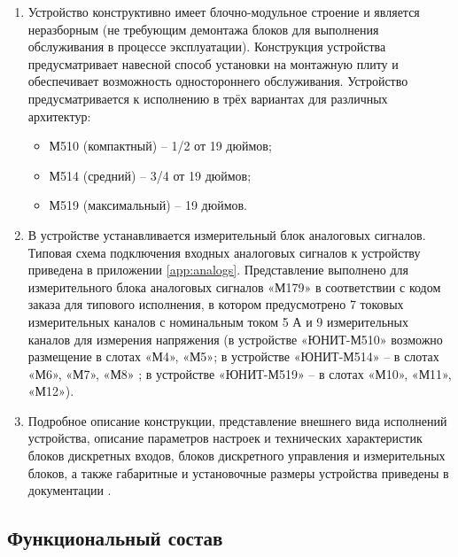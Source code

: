 \begin{enumerate}
\item Устройство конструктивно имеет блочно-модульное строение и является неразборным (не требующим демонтажа блоков для выполнения обслуживания в процессе эксплуатации).
Конструкция устройства предусматривает навесной способ установки на монтажную плиту и обеспечивает возможность одностороннего обслуживания.
Устройство предусматривается к исполнению в трёх вариантах для различных архитектур:
\begin{itemize}
\item М510 (компактный) – 1/2 от 19 дюймов;
\item М514 (средний) – 3/4 от 19 дюймов;
\item М519 (максимальный) – 19 дюймов.
\end{itemize}
\item В устройстве устанавливается измерительный блок аналоговых сигналов. Типовая схема подключения входных аналоговых сигналов к устройству приведена в приложении \ref{app:analogs}. Представление выполнено для измерительного блока аналоговых сигналов «М179» в соответствии с кодом заказа для типового исполнения, в котором предусмотрено 7 токовых измерительных каналов с номинальным током 5 А и 9 измерительных каналов для измерения напряжения (в устройстве «ЮНИТ-М510» возможно размещение в слотах «М4», «М5»; в устройстве «ЮНИТ-М514» -- в слотах «М6», «М7», «М8» ; в устройстве «ЮНИТ-М519» -- в слотах «М10», «М11», «М12»).
\item Подробное описание конструкции, представление внешнего вида исполнений устройства, описание параметров настроек и технических характеристик блоков дискретных входов, блоков дискретного управления и измерительных блоков, а также габаритные и установочные размеры устройства приведены в документации \ManualUnitGeneral.
\end{enumerate}

{\color{unidarkgreen}\subsection{Функциональный состав}}

